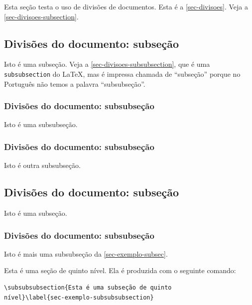 Esta seção testa o uso de divisões de documentos. Esta é a
\autoref{sec-divisoes}. Veja a \autoref{sec-divisoes-subsection}.

\subsection{Divisões do documento: subseção}\label{sec-divisoes-subsection}

Isto é uma subseção. Veja a \autoref{sec-divisoes-subsubsection}, que é uma
\texttt{subsubsection} do \LaTeX, mas é impressa chamada de ``subseção'' porque
no Português não temos a palavra ``subsubseção''.

\subsubsection{Divisões do documento: subsubseção}
\label{sec-divisoes-subsubsection}

Isto é uma subsubseção.

\subsubsection{Divisões do documento: subsubseção}

Isto é outra subsubseção.

\subsection{Divisões do documento: subseção}\label{sec-exemplo-subsec}

Isto é uma subseção.

\subsubsection{Divisões do documento: subsubseção}

Isto é mais uma subsubseção da \autoref{sec-exemplo-subsec}.


\label{sec-exemplo-subsubsubsection}

Esta é uma seção de quinto nível. Ela é produzida com o seguinte comando:
\begin{verbatim}
\subsubsubsection{Esta é uma subseção de quinto
nível}\label{sec-exemplo-subsubsubsection}
\end{verbatim}

\label{sec-exemplo-subsubsubsection-outro}

